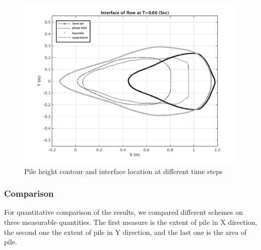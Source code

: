\documentclass[letterpaper,10pt]{article}
\begin{document}
\begin{figure}[H]
\begin{minipage}[b]{.48 \linewidth}
		\includegraphics[width=1\textwidth]{IMAGES/interface660exp.png}
	\end{minipage}
	\caption{Pile height contour and interface location at different time steps}
	\label{odinary}
\end{figure}

\subsubsection{Comparison}

For quantitative comparison of the results, we compared different schemes on three measurable quantities. The first measure is the extent of pile in X direction, the second one the extent of pile in Y direction, and the last one is the area of pile.
\end{document}

